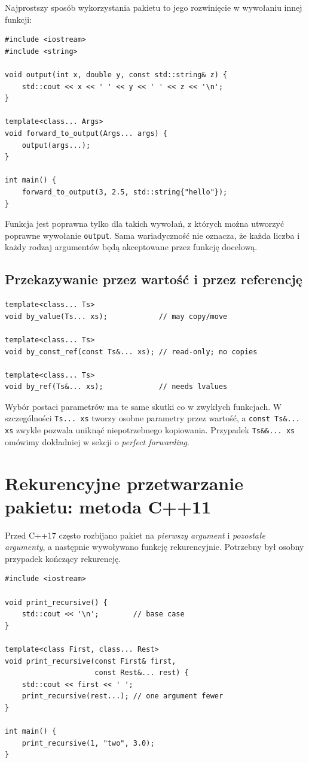 Najprostszy sposób wykorzystania pakietu to jego rozwinięcie
w wywołaniu innej funkcji:

\begin{lstlisting}
#include <iostream>
#include <string>

void output(int x, double y, const std::string& z) {
    std::cout << x << ' ' << y << ' ' << z << '\n';
}

template<class... Args>
void forward_to_output(Args... args) {
    output(args...);
}

int main() {
    forward_to_output(3, 2.5, std::string{"hello"});
}
\end{lstlisting}

Funkcja jest poprawna tylko dla takich wywołań, z których można
utworzyć poprawne wywołanie \texttt{output}. Sama wariadyczność
nie oznacza, że każda liczba i każdy rodzaj argumentów będą
akceptowane przez funkcję docelową.

\subsection{Przekazywanie przez wartość i przez referencję}

\begin{lstlisting}
template<class... Ts>
void by_value(Ts... xs);            // may copy/move

template<class... Ts>
void by_const_ref(const Ts&... xs); // read-only; no copies

template<class... Ts>
void by_ref(Ts&... xs);             // needs lvalues
\end{lstlisting}

Wybór postaci parametrów ma te same skutki co w zwykłych funkcjach.
W szczególności \texttt{Ts... xs} tworzy osobne parametry przez wartość,
a \texttt{const Ts\&... xs} zwykle pozwala uniknąć niepotrzebnego
kopiowania. Przypadek \texttt{Ts\&\&... xs} omówimy dokładniej
w sekcji o \emph{perfect forwarding}.

\section{Rekurencyjne przetwarzanie pakietu: metoda C++11}
\label{sec:variadic-rekurencja}

Przed C++17 często rozbijano pakiet na \emph{pierwszy argument}
i \emph{pozostałe argumenty}, a następnie wywoływano funkcję
rekurencyjnie. Potrzebny był osobny przypadek kończący rekurencję.

\begin{lstlisting}
#include <iostream>

void print_recursive() {
    std::cout << '\n';        // base case
}

template<class First, class... Rest>
void print_recursive(const First& first,
                     const Rest&... rest) {
    std::cout << first << ' ';
    print_recursive(rest...); // one argument fewer
}

int main() {
    print_recursive(1, "two", 3.0);
}
\end{lstlisting}

